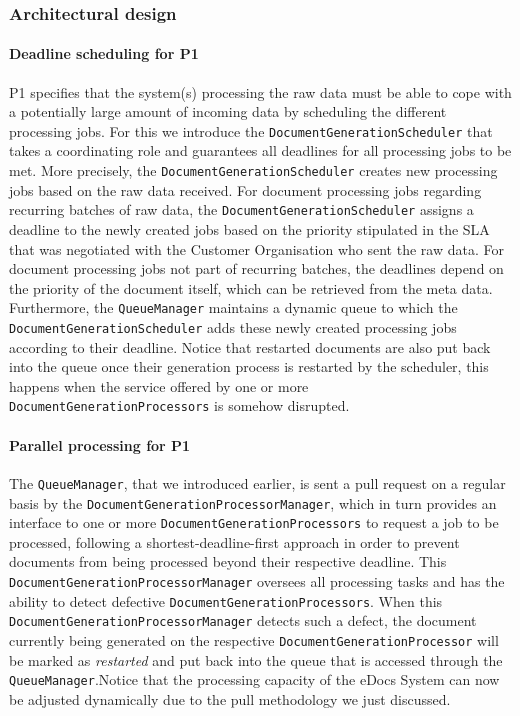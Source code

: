 \documentclass[a4paper,10pt]{article}
\begin{document}
\subsubsection{Architectural design}
\paragraph{Deadline scheduling for P1}
P1 specifies that the system(s) processing the raw data must be able to cope with a potentially large amount of incoming data by scheduling the different processing jobs. For this we introduce the \texttt{DocumentGenerationScheduler} that takes a coordinating role and guarantees all deadlines for all processing jobs to be met. More precisely, the \texttt{DocumentGenerationScheduler} creates new processing jobs based on the raw data received. For document processing jobs regarding recurring batches of raw data, the \texttt{DocumentGenerationScheduler} assigns a deadline to the newly created jobs based on the priority stipulated in the SLA that was negotiated with the Customer Organisation who sent the raw data. For document processing jobs not part of recurring batches, the deadlines depend on the priority of the document itself, which can be retrieved from the meta data. Furthermore, the \texttt{QueueManager} maintains a dynamic queue to which the \texttt{DocumentGenerationScheduler} adds these newly created processing jobs according to their deadline. Notice that restarted documents are also put back into the queue once their generation process is restarted by the scheduler, this happens when the service offered by one or more \texttt{DocumentGenerationProcessors} is somehow disrupted. 

\paragraph{Parallel processing for P1}
The \texttt{QueueManager}, that we introduced earlier, is sent a pull request on a regular basis by the \texttt{DocumentGenerationProcessorManager}, which in turn provides an interface to one or more \texttt{DocumentGenerationProcessors} to request a job to be processed, following a shortest-deadline-first approach in order to prevent documents from being processed beyond their respective deadline. This \texttt{DocumentGenerationProcessorManager} oversees all processing tasks and has the ability to detect defective \texttt{DocumentGenerationProcessors}. When this \texttt{DocumentGenerationProcessorManager} detects such a defect, the document currently being generated on the respective \texttt{DocumentGenerationProcessor} will be marked as \textit{restarted} and put back into the queue that is accessed through the \texttt{QueueManager}.Notice that the processing capacity of the eDocs System can now be adjusted dynamically due to the pull methodology we just discussed.
\end{document}
